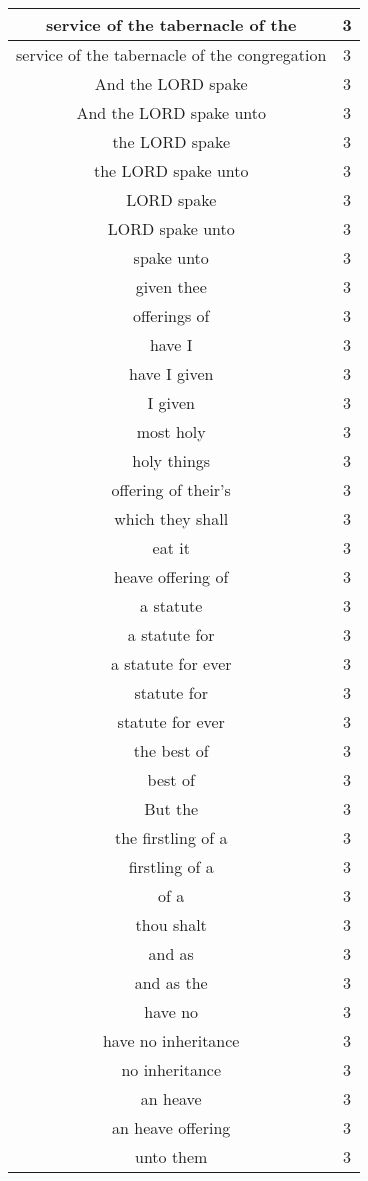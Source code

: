 \begin{center}
\begin{longtable}{|c|c|}
service of the tabernacle of the & 3\\ \hline 
service of the tabernacle of the congregation & 3\\ \hline 
And the LORD spake & 3\\ \hline 
And the LORD spake unto & 3\\ \hline 
the LORD spake & 3\\ \hline 
the LORD spake unto & 3\\ \hline 
LORD spake & 3\\ \hline 
LORD spake unto & 3\\ \hline 
spake unto & 3\\ \hline 
given thee & 3\\ \hline 
offerings of & 3\\ \hline 
have I & 3\\ \hline 
have I given & 3\\ \hline 
I given & 3\\ \hline 
most holy & 3\\ \hline 
holy things & 3\\ \hline 
offering of their's & 3\\ \hline 
which they shall & 3\\ \hline 
eat it & 3\\ \hline 
heave offering of & 3\\ \hline 
a statute & 3\\ \hline 
a statute for & 3\\ \hline 
a statute for ever & 3\\ \hline 
statute for & 3\\ \hline 
statute for ever & 3\\ \hline 
the best of & 3\\ \hline 
best of & 3\\ \hline 
But the & 3\\ \hline 
the firstling of a & 3\\ \hline 
firstling of a & 3\\ \hline 
of a & 3\\ \hline 
thou shalt & 3\\ \hline 
and as & 3\\ \hline 
and as the & 3\\ \hline 
have no & 3\\ \hline 
have no inheritance & 3\\ \hline 
no inheritance & 3\\ \hline 
an heave & 3\\ \hline 
an heave offering & 3\\ \hline 
unto them & 3\\ \hline 
\end{longtable}
\end{center}





